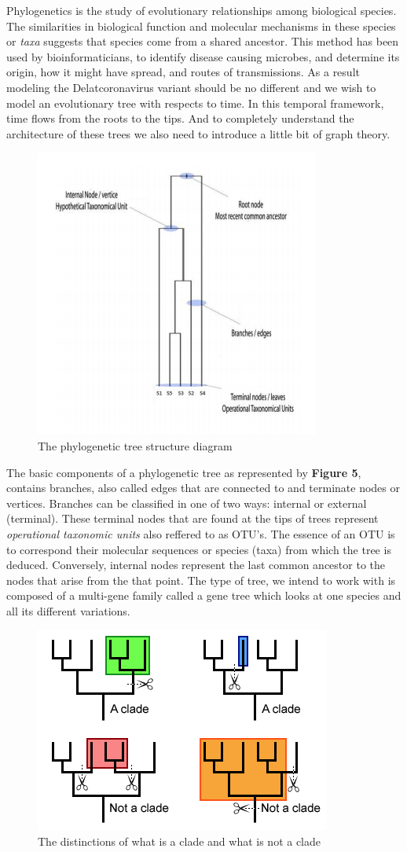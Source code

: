 Phylogenetics is the study of evolutionary relationships among biological species. The similarities in biological function and molecular mechanisms in these species or \emph{taxa} suggests that species come from a shared ancestor. This method has been used by bioinformaticians, to identify disease causing microbes, and determine its origin, how it might have spread, and routes of transmissions. As a result modeling the Delatcoronavirus variant should be no different and we wish to model an evolutionary tree with respects to time. In this temporal framework, time flows from the roots to the tips. And to completely understand the architecture of these trees we also need to introduce a little bit of graph theory. 

\begin{figure}[h]
\centering
\includegraphics[width=.5\textwidth]{figures/ptrep.png}
\caption{The phylogenetic tree structure diagram}
\end{figure}

The basic components of a phylogenetic tree as represented by \textbf{Figure 5}, contains branches, also called edges that are connected to and terminate nodes or vertices. Branches can be classified in one of two ways: internal or external (terminal). These terminal nodes that are found at the tips of trees represent \emph{operational taxonomic units} also reffered to as OTU's. The essence of an OTU is to correspond their molecular sequences or species (taxa) from which the tree is deduced. Conversely, internal nodes represent the last common ancestor to the nodes that arise from the that point. The type of tree, we intend to work with is composed of a multi-gene family called a gene tree which looks at one species and all its different variations.

\begin{figure}[h]
\centering
\includegraphics[width=.35\textwidth]{figures/clade.pdf}
\caption{The distinctions of what is a clade and what is not a clade}
\end{figure}   

